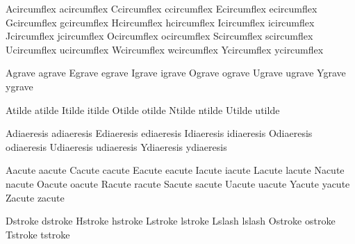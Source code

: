 

 Acircumflex acircumflex
 Ccircumflex ccircumflex
 Ecircumflex ecircumflex
 Gcircumflex gcircumflex
 Hcircumflex hcircumflex
 Icircumflex icircumflex
 Jcircumflex jcircumflex
 Ocircumflex ocircumflex
 Scircumflex scircumflex
 Ucircumflex ucircumflex
 Wcircumflex wcircumflex
 Ycircumflex ycircumflex

 Agrave agrave
 Egrave egrave
 Igrave igrave
 Ograve ograve
 Ugrave ugrave
 Ygrave ygrave

 Atilde atilde
 Itilde itilde
 Otilde otilde
 Ntilde ntilde
 Utilde utilde

 Adiaeresis adiaeresis
 Ediaeresis ediaeresis
 Idiaeresis idiaeresis
 Odiaeresis odiaeresis
 Udiaeresis udiaeresis
 Ydiaeresis ydiaeresis

 Aacute aacute
 Cacute cacute
 Eacute eacute
 Iacute iacute
 Lacute lacute
 Nacute nacute
 Oacute oacute
 Racute racute
 Sacute sacute
 Uacute uacute
 Yacute yacute
 Zacute zacute

 Dstroke dstroke
 Hstroke hstroke
 Lstroke lstroke
 Lslash  lslash %
 Ostroke ostroke
 Tstroke tstroke

